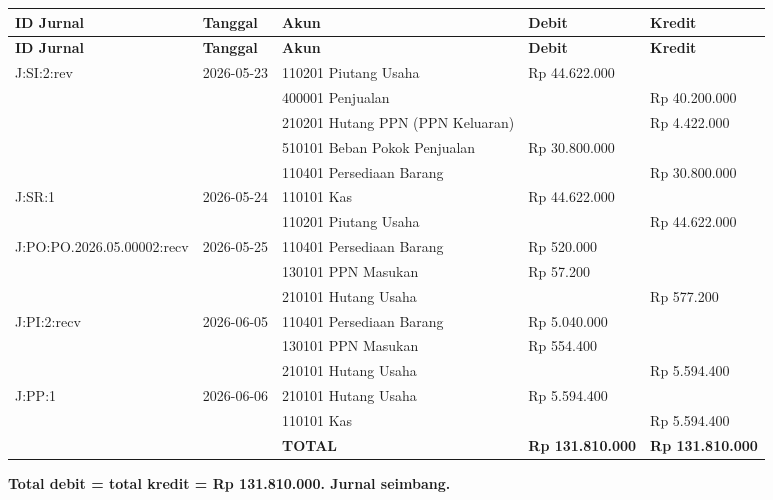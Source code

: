 \documentclass[11pt,a4paper]{article}
\begin{document}
{\setlength{\tabcolsep}{5pt}\footnotesize
\begin{longtable}{p{3.9cm} l p{4.6cm} R{2.6cm} R{2.6cm}}
\toprule
\textbf{ID Jurnal} & \textbf{Tanggal} & \textbf{Akun} & \textbf{Debit} & \textbf{Kredit} \\
\midrule\endfirsthead
\toprule
\textbf{ID Jurnal} & \textbf{Tanggal} & \textbf{Akun} & \textbf{Debit} & \textbf{Kredit} \\
\midrule\endhead
\bottomrule\endfoot
J:SI:2:rev & 2026-05-23 & 110201 Piutang Usaha & Rp 44.622.000 &  \\
 &  & 400001 Penjualan &  & Rp 40.200.000 \\
 &  & 210201 Hutang PPN (PPN Keluaran) &  & Rp 4.422.000 \\
 &  & 510101 Beban Pokok Penjualan & Rp 30.800.000 &  \\
 &  & 110401 Persediaan Barang &  & Rp 30.800.000 \\
J:SR:1 & 2026-05-24 & 110101 Kas & Rp 44.622.000 &  \\
 &  & 110201 Piutang Usaha &  & Rp 44.622.000 \\
J:PO:PO.2026.05.00002:recv & 2026-05-25 & 110401 Persediaan Barang & Rp 520.000 &  \\
 &  & 130101 PPN Masukan & Rp 57.200 &  \\
 &  & 210101 Hutang Usaha &  & Rp 577.200 \\
J:PI:2:recv & 2026-06-05 & 110401 Persediaan Barang & Rp 5.040.000 &  \\
 &  & 130101 PPN Masukan & Rp 554.400 &  \\
 &  & 210101 Hutang Usaha &  & Rp 5.594.400 \\
J:PP:1 & 2026-06-06 & 210101 Hutang Usaha & Rp 5.594.400 &  \\
 &  & 110101 Kas &  & Rp 5.594.400 \\
 &  & \textbf{TOTAL} & \textbf{Rp 131.810.000} & \textbf{Rp 131.810.000} \\
\end{longtable}}

\vspace{2pt}\noindent\colorbox{soft}{\parbox{\dimexpr\linewidth-2\fboxsep}{\textbf{Total debit = total kredit = Rp 131.810.000. Jurnal seimbang.}}}\vspace{4pt}
\end{document}
